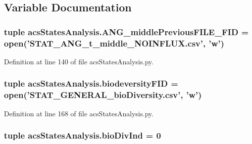 \subsection{Variable Documentation}
\hypertarget{a00098_aa5eb16eef2c90e2ccc991eb176280f21}{
\subsubsection[{A\-N\-G\-\_\-middle\-Previous\-F\-I\-L\-E\-\_\-\-F\-I\-D}]{\setlength{\rightskip}{0pt plus 5cm}tuple acs\-States\-Analysis.\-A\-N\-G\-\_\-middle\-Previous\-F\-I\-L\-E\-\_\-\-F\-I\-D = open('S\-T\-A\-T\-\_\-\-A\-N\-G\-\_\-t\-\_\-middle\-\_\-\-N\-O\-I\-N\-F\-L\-U\-X.\-csv', 'w')}}\label{a00098_aa5eb16eef2c90e2ccc991eb176280f21}


Definition at line 140 of file acs\-States\-Analysis.\-py.

\hypertarget{a00098_a68c23cb79e89d9e14acf9ed09f46f0e4}{
\subsubsection[{biodeversity\-F\-I\-D}]{\setlength{\rightskip}{0pt plus 5cm}tuple acs\-States\-Analysis.\-biodeversity\-F\-I\-D = open('S\-T\-A\-T\-\_\-\-G\-E\-N\-E\-R\-A\-L\-\_\-bio\-Diversity.\-csv', 'w')}}\label{a00098_a68c23cb79e89d9e14acf9ed09f46f0e4}


Definition at line 168 of file acs\-States\-Analysis.\-py.

\hypertarget{a00098_a247328d05f06695b0c2de9a001ca4548}{
\subsubsection[{bio\-Div\-Ind}]{\setlength{\rightskip}{0pt plus 5cm}tuple acs\-States\-Analysis.\-bio\-Div\-Ind = 0}}\label{a00098_a247328d05f06695b0c2de9a001ca4548}


